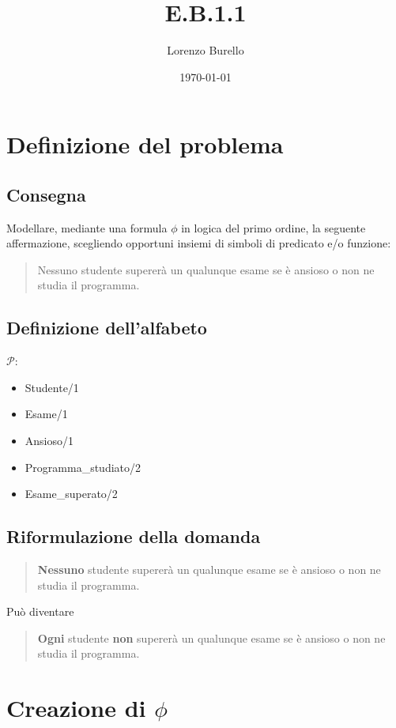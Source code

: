 \documentclass[a4paper, 12pt]{article}
\title{E.B.1.1}
\author{Lorenzo Burello}
\date{\today}
\begin{document}
\maketitle

\section{Definizione del problema}
\subsection{Consegna}
Modellare, mediante una formula $\phi$ in logica del primo ordine,
la seguente affermazione, scegliendo opportuni insiemi di simboli
di predicato e/o funzione: \newline
\begin{quote}
    Nessuno studente supererà un qualunque esame se è ansioso o non ne studia il programma.
\end{quote}
\subsection{Definizione dell'alfabeto}

$\mathcal{P}$:
\begin{itemize}[label=-]
    \item Studente/1
    \item Esame/1
    \item Ansioso/1
    \item Programma\_studiato/2
    \item Esame\_superato/2
\end{itemize}

\subsection{Riformulazione della domanda}
\begin{quote}
    \textbf{Nessuno} studente supererà un qualunque esame se è ansioso o non ne studia il programma.
\end{quote}
Può diventare
\begin{quote}
    \textbf{Ogni} studente \textbf{non} supererà un qualunque esame se è ansioso o non ne studia il programma.
\end{quote}

\section{Creazione di $\phi$}
\end{document}

